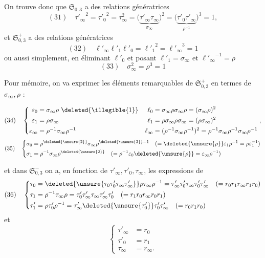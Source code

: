 On trouve donc que $\mathfrak S_{0,3}$ a des  relations génératrices
\[
(31)\quad
{\tau'_\infty}^{2}={\tau'_0}^{2}=\tau_\infty^2
=\bigl(\underbrace{\tau'_\infty\tau_\infty}_{\sigma_\infty}\bigr)^2
=\bigl(\underbrace{\tau'_0\tau'_\infty}_{\rho^{-1}}\bigr)^3=1,
\]
et $\mathfrak S_{0,3}^{+}$ a des relations génératrices
\[
(32)\quad \ell'_\infty \ell'_1\ell'_0={\ell'_1}^{2}={\ell'_\infty}^{3}=1
\]
ou aussi simplement, en éliminant $\ell'_0$ et posant
$\ell'_1=\sigma_\infty$ et ${\ell'_\infty}^{-1}=\rho$
\[
(33)\quad\boxed{\sigma_\infty^2=\rho^3=1}
\]

Pour mémoire, on va exprimer les éléments remarquables de $\mathfrak S_{0,3}^{+}$ en termes de $\sigma_\infty,\rho$ :


\[
(34)\quad\left\{\begin{aligned}
\varepsilon_0&=\sigma_\infty\rho\ \deleted{\illegible{1}}&
\ell_0&=\sigma_\infty\rho\sigma_\infty\rho=(\sigma_\infty\rho)^2\\
\varepsilon_1&=\rho\sigma_\infty&
\ell_1&=\rho\sigma_\infty\rho\sigma_\infty=(\rho\sigma_\infty)^2\\
\varepsilon_\infty&=\rho^{-1}\sigma_\infty\rho^{-1}&
\ell_\infty&=(\rho^{-1}\sigma_\infty\rho^{-1})^2
=\rho^{-1}\sigma_\infty\rho^{-1}\sigma_\infty\rho^{-1}
\end{aligned}\right.,
\]
\[
(35)\quad\left\{\begin{aligned}
\sigma_0&=\rho^{\deleted{\unsure{2}}}\sigma_\infty\rho^{\deleted{\unsure{2}}-1}
\quad(=\deleted{\unsure{\rho}}\varepsilon_1\rho^{-1}=\rho\varepsilon_1^{-1})\\
\sigma_1&=\rho^{-1}\sigma_\infty\rho^{\deleted{\unsure{2}}}
\quad(=\rho^{-1}\varepsilon_0\deleted{\unsure{\rho}}=\varepsilon_\infty\rho^{-1})
\end{aligned}\right.
\]

et dans $\mathfrak S_{0,3}^{-}$ on a, en fonction de $\tau'_\infty,\tau'_0,\tau_\infty$,
les expressions de 
\[
(36)\quad\left\{\begin{aligned}
\tau_0&=\deleted{\unsure{\tau_0\tau'_0\tau_\infty\tau'_\infty}}\rho\tau_\infty\rho^{-1}
=\tau'_\infty\tau'_0\tau_\infty\tau'_0\tau'_\infty
\quad(=r_0r_1r_\infty r_1r_0)\\
\tau_1&=\rho^{-1}\tau_\infty\rho
=\tau'_0\tau'_\infty\tau_\infty\tau'_\infty\tau'_0
\quad(=r_1r_0r_\infty r_0r_1)\\
\tau'_1&=\rho\tau'_0\rho^{-1}
=\tau'_\infty\deleted{\unsure{\tau'_0}}\tau'_0\tau'_\infty
\quad(=r_0r_1r_0)
\end{aligned}\right.
\]
et
\[
\left\{\begin{aligned}
\tau'_\infty&=r_0\\
\tau'_0&=r_1\\
\tau_\infty&=r_\infty.
\end{aligned}\right.
\]


